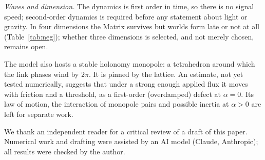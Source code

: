 \documentclass[reprint,pre,amsmath,amssymb,superscriptaddress,nofootinbib]{revtex4-2}
\begin{document}
\emph{Waves and dimension.} The dynamics is first order in time, so there is no signal speed; second-order dynamics is required before any statement about light or gravity. In four dimensions the Matrix survives but worlds form late or not at all (Table~\ref{tab:neg}); whether three dimensions is selected, and not merely chosen, remains open.

The model also hosts a stable holonomy monopole: a tetrahedron around which the link phases wind by $2\pi$. It is pinned by the lattice. An estimate, not yet tested numerically, suggests that under a strong enough applied flux it moves with friction and a threshold, as a first-order (overdamped) defect at $\alpha=0$. Its law of motion, the interaction of monopole pairs and possible inertia at $\alpha>0$ are left for separate work.

\begin{acknowledgments}
We thank an independent reader for a critical review of a draft of this paper. Numerical work and drafting were assisted by an AI model (Claude, Anthropic); all results were checked by the author.
\end{acknowledgments}
\end{document}
